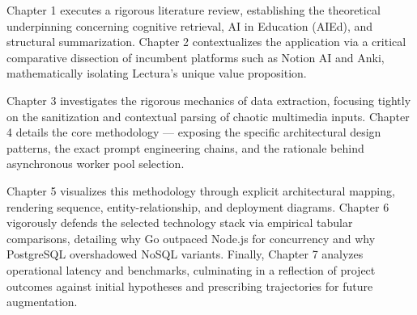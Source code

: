 Chapter 1 executes a rigorous literature review, establishing the theoretical underpinning concerning cognitive retrieval, AI in Education (AIEd), and structural summarization. Chapter 2 contextualizes the application via a critical comparative dissection of incumbent platforms such as Notion AI and Anki, mathematically isolating Lectura’s unique value proposition.

Chapter 3 investigates the rigorous mechanics of data extraction, focusing tightly on the sanitization and contextual parsing of chaotic multimedia inputs. Chapter 4 details the core methodology — exposing the specific architectural design patterns, the exact prompt engineering chains, and the rationale behind asynchronous worker pool selection. 

Chapter 5 visualizes this methodology through explicit architectural mapping, rendering sequence, entity-relationship, and deployment diagrams. Chapter 6 vigorously defends the selected technology stack via empirical tabular comparisons, detailing why Go outpaced Node.js for concurrency and why PostgreSQL overshadowed NoSQL variants. Finally, Chapter 7 analyzes operational latency and benchmarks, culminating in a reflection of project outcomes against initial hypotheses and prescribing trajectories for future augmentation.